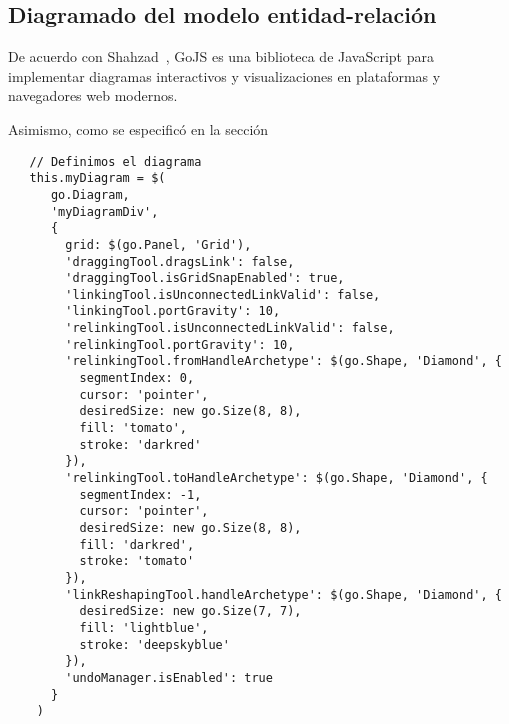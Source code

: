 \subsection{Diagramado del modelo entidad-relación}
De acuerdo con Shahzad~\cite{shahzad_review_2016}, GoJS es una biblioteca de JavaScript para implementar diagramas interactivos y visualizaciones en plataformas y navegadores web modernos. 

Asimismo, como se especificó en la sección 
\begin{verbatim}
   // Definimos el diagrama
   this.myDiagram = $(
      go.Diagram,
      'myDiagramDiv', 
      {
        grid: $(go.Panel, 'Grid'),
        'draggingTool.dragsLink': false,
        'draggingTool.isGridSnapEnabled': true,
        'linkingTool.isUnconnectedLinkValid': false,
        'linkingTool.portGravity': 10,
        'relinkingTool.isUnconnectedLinkValid': false,
        'relinkingTool.portGravity': 10,
        'relinkingTool.fromHandleArchetype': $(go.Shape, 'Diamond', {
          segmentIndex: 0,
          cursor: 'pointer',
          desiredSize: new go.Size(8, 8),
          fill: 'tomato',
          stroke: 'darkred'
        }),
        'relinkingTool.toHandleArchetype': $(go.Shape, 'Diamond', {
          segmentIndex: -1,
          cursor: 'pointer',
          desiredSize: new go.Size(8, 8),
          fill: 'darkred',
          stroke: 'tomato'
        }),
        'linkReshapingTool.handleArchetype': $(go.Shape, 'Diamond', {
          desiredSize: new go.Size(7, 7),
          fill: 'lightblue',
          stroke: 'deepskyblue'
        }),
        'undoManager.isEnabled': true
      }
    )
\end{verbatim}